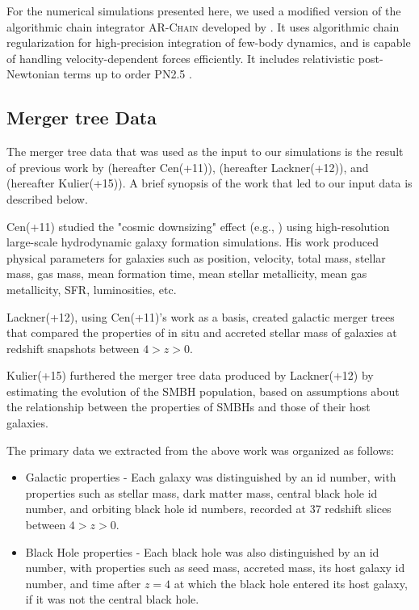\documentclass[english, apj]{emulateapj}
\begin{document}
For the numerical simulations presented here, we used a modified version of the algorithmic chain integrator \textsc{AR-Chain} developed by \citet{2006MNRAS.372..219M}. It uses algorithmic chain regularization for high-precision integration of few-body dynamics, and is capable of handling velocity-dependent forces efficiently. It includes relativistic post-Newtonian terms up to order PN2.5 \citep{2008AJ....135.2398M}.


\subsection{Merger tree Data}
The merger tree data that was used as the input to our simulations is the result of previous work by \citet{2011ApJ...741...99C, 2011ApJ...742L..33C, 2012ApJ...753...17C, 2012ApJ...748..121C, 2013ApJ...770..139C} (hereafter Cen(+11)), \citet{2012MNRAS.425..641L} (hereafter Lackner(+12)), and \citet{2015ApJ...799..178K} (hereafter Kulier(+15)).  A brief synopsis of the work that led to our input data is described below.

Cen(+11) studied the "cosmic downsizing" effect (e.g., \citet{1996AJ....112..839C}) using high-resolution large-scale hydrodynamic galaxy formation simulations.  His work produced physical parameters for galaxies such as position, velocity, total mass, stellar mass, gas mass, mean formation time, mean stellar metallicity, mean gas metallicity, SFR, luminosities, etc.

Lackner(+12), using Cen(+11)'s work as a basis, created galactic merger trees that compared the properties of in situ and accreted stellar mass of galaxies at redshift snapshots between $4 > z > 0$.

Kulier(+15) furthered the merger tree data produced by Lackner(+12) by estimating the evolution of the SMBH population, based on assumptions about the relationship between the properties of SMBHs and those of their host galaxies.

The primary data we extracted from the above work was organized as follows:
\begin{itemize}
    \item Galactic properties - Each galaxy was distinguished by an id number, with properties such as stellar mass, dark matter mass, central black hole id number, and orbiting black hole id numbers, recorded at 37 redshift slices between $4 > z > 0$.
    \item Black Hole properties - Each black hole was also distinguished by an id number, with properties such as seed mass, accreted mass, its host galaxy id number, and time after $z=4$ at which the black hole entered its host galaxy, if it was not the central black hole.
\end{itemize}
\end{document}
